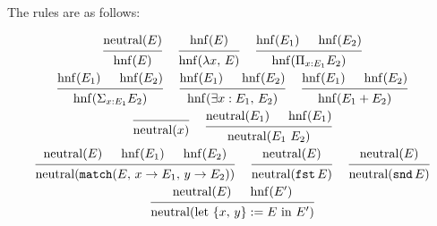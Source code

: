 \documentclass{article}
\begin{document}
The rules are as follows:
\begin{spreadlines}{2em}
  \begin{gather*}
    \begin{prooftree}
      \hypo{\neutral(E)}
      \infer1{\hnf(E)}
    \end{prooftree}
  ~ \quad
    \begin{prooftree}
      \hypo{\hnf(E)}
      \infer1{\hnf(\lambda x, \, E)}
    \end{prooftree}
  ~ \quad
    \begin{prooftree}
      \hypo{\hnf(E_1)}
      \hypo{\hnf(E_2)}
      \infer2{\hnf(\Pi_{x : E_1} E_2)}
    \end{prooftree}
  \\
    \begin{prooftree}
      \hypo{\hnf(E_1)}
      \hypo{\hnf(E_2)}
      \infer2{\hnf(\Sigma_{x : E_1} E_2)}
    \end{prooftree}
  ~ \quad
    \begin{prooftree}
      \hypo{\hnf(E_1)}
      \hypo{\hnf(E_2)}
      \infer2{\hnf(\exists x : E_1, \, E_2)}
    \end{prooftree}
  ~ \quad
    \begin{prooftree}
      \hypo{\hnf(E_1)}
      \hypo{\hnf(E_2)}
      \infer2{\hnf(E_1 + E_2)}
    \end{prooftree}
  \\
    \begin{prooftree}
      \infer0{\neutral(x)}
    \end{prooftree}
  ~ \quad
    \begin{prooftree}
      \hypo{\neutral(E_1)} 
      \hypo{\hnf(E_1)} 
      \infer2{\neutral(E_1 \,\, E_2)}
    \end{prooftree}
  \\
    \begin{prooftree}
      \hypo{\neutral(E)} 
      \hypo{\hnf(E_1)} 
      \hypo{\hnf(E_2)} 
      \infer3{\neutral(\match(E, \, x \rightarrow E_1, \, y \rightarrow E_2))}
    \end{prooftree}
  ~ \quad
    \begin{prooftree}
      \hypo{\neutral(E)} 
      \infer1{\neutral(\fst \, E)}
    \end{prooftree}
  ~ \quad
    \begin{prooftree}
      \hypo{\neutral(E)} 
      \infer1{\neutral(\snd \, E)}
    \end{prooftree}
  \\
    \begin{prooftree}
      \hypo{\neutral(E)} 
      \hypo{\hnf(E')} 
      \infer2{\neutral(\text{let } \{x, \, y\} := E \text{ in } E')}
    \end{prooftree}
  \end{gather*}
\end{spreadlines}
\end{document}
